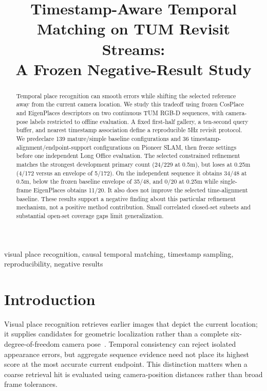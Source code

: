 \documentclass[conference,letterpaper]{IEEEtran}
\begin{document}
\title{Timestamp-Aware Temporal Matching on TUM Revisit Streams:\\A Frozen Negative-Result Study}
\author{}
\maketitle
\begin{abstract}
Temporal place recognition can smooth errors while shifting the selected reference away from the current camera location. We study this tradeoff using frozen CosPlace and EigenPlaces descriptors on two continuous TUM RGB-D sequences, with camera-pose labels restricted to offline evaluation. A fixed first-half gallery, a ten-second query buffer, and nearest timestamp association define a reproducible 5Hz revisit protocol. We predeclare 139 mature/simple baseline configurations and 36 timestamp-alignment/endpoint-support configurations on Pioneer SLAM, then freeze settings before one independent Long Office evaluation. The selected constrained refinement matches the strongest development primary count (24/229 at 0.5m), but loses at 0.25m (4/172 versus an envelope of 5/172). On the independent sequence it obtains 34/48 at 0.5m, below the frozen baseline envelope of 35/48, and 0/20 at 0.25m while single-frame EigenPlaces obtains 11/20. It also does not improve the selected time-alignment baseline. These results support a negative finding about this particular refinement mechanism, not a positive method contribution. Small correlated closed-set subsets and substantial open-set coverage gaps limit generalization.
\end{abstract}
\begin{IEEEkeywords}visual place recognition, causal temporal matching, timestamp sampling, reproducibility, negative results\end{IEEEkeywords}
\section{Introduction}
Visual place recognition retrieves earlier images that depict the current location; it supplies candidates for geometric localization rather than a complete six-degree-of-freedom camera pose~\cite{tutorial}. Temporal consistency can reject isolated appearance errors, but aggregate sequence evidence need not place its highest score at the most accurate current endpoint. This distinction matters when a coarse retrieval hit is evaluated using camera-position distances rather than broad frame tolerances.
\end{document}
